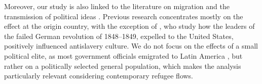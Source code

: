 Moreover, our study is also linked to the literature on migration and the transmission of political ideas \citep{spilimbergo_democracy_2009, barsbai_effect_2017, dippel_leadership_2021, calderon_racial_2023, bazzi_confederate_2023}. Previous research concentrates mostly on the effect at the origin country, with the exception of \citet{dippel_leadership_2021}, who study how the leaders of the failed German revolution of 1848–1849, expelled to the United States, positively influenced antislavery culture. We do not focus on the effects of a small political elite, as most government officials emigrated to Latin America \citep{alted2005vencidos}, but rather on a politically selected general population, which makes the analysis particularly relevant considering contemporary refugee flows. 